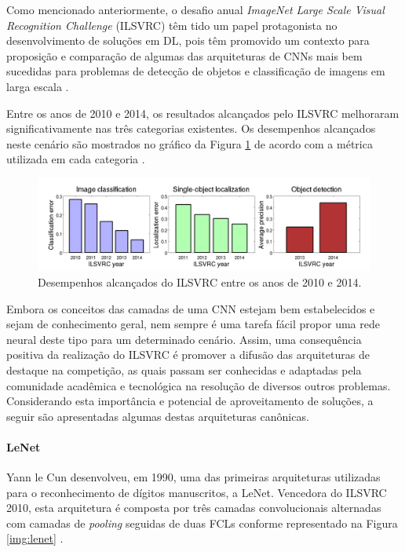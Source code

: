 Como mencionado anteriormente, o desafio anual \emph{ImageNet Large Scale Visual Recognition Challenge} (ILSVRC) têm tido um papel protagonista no desenvolvimento de soluções em DL, pois têm promovido um contexto para proposição e comparação de algumas das arquiteturas de CNNs mais bem sucedidas para problemas de detecção de objetos e classificação de imagens em larga escala \cite{ILSVRC}.

Entre os anos de 2010 e 2014, os resultados alcançados pelo ILSVRC melhoraram significativamente nas três categorias existentes. Os desempenhos alcançados neste cenário são mostrados no gráfico da Figura \ref{fig:ilsvrc} de acordo com a métrica utilizada em cada categoria \cite{ILSVRC}.   

\begin{figure}[h]
	\centering
	\includegraphics[width=1\textwidth]{./img/ilsvrc}
	\caption{Desempenhos alcançados do ILSVRC entre os anos de 2010 e 2014.}
	\label{fig:ilsvrc}
\end{figure}

Embora os conceitos das camadas de uma CNN estejam bem estabelecidos e sejam de conhecimento geral, nem sempre é uma tarefa fácil propor uma rede neural deste tipo para um determinado cenário. Assim, uma consequência positiva da realização do ILSVRC é promover a difusão das arquiteturas de destaque na competição, as quais passam ser conhecidas e adaptadas pela comunidade acadêmica e tecnológica na resolução de diversos outros problemas. Considerando esta importância e potencial de aproveitamento de soluções, a seguir são apresentadas algumas destas arquiteturas canônicas.


\paragraph{LeNet} Yann le Cun desenvolveu, em 1990, uma das primeiras arquiteturas utilizadas para o reconhecimento de dígitos manuscritos, a LeNet. Vencedora do ILSVRC 2010, esta arquitetura é composta por três camadas convolucionais alternadas com camadas de \textit{pooling} seguidas de duas FCLs conforme representado na Figura \ref{img:lenet} \cite{ref:sewak,ref:khan}.


